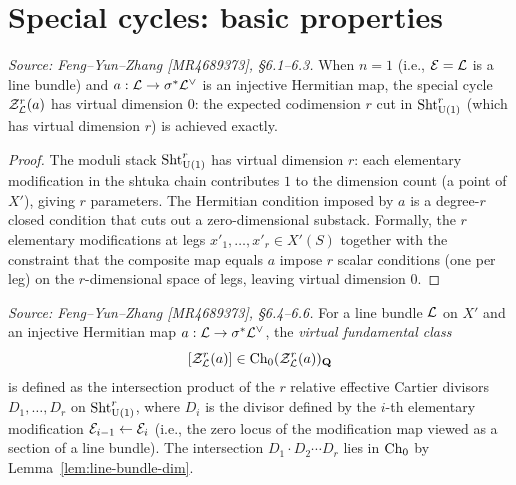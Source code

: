 \section{Special cycles: basic properties}

\begin{lemma}
  \label{lem:line-bundle-dim}
  \textit{Source: Feng--Yun--Zhang [MR4689373], \S6.1--6.3.}
  When \(n = 1\) (i.e., \(\mathcal{E} = \mathcal{L}\) is a line bundle) and
  \(a : \mathcal{L} \to \sigma^*\mathcal{L}^\vee\) is an injective Hermitian map, the special cycle
  \(\mathcal{Z}_{\mathcal{L}}^r(a)\) has virtual dimension \(0\): the expected codimension \(r\) cut
  in \(\operatorname{Sht}_{\operatorname{U}(1)}^r\) (which has virtual dimension \(r\)) is achieved exactly.
\end{lemma}

\begin{proof}
  The moduli stack \(\operatorname{Sht}_{\operatorname{U}(1)}^r\) has virtual dimension \(r\): each elementary
  modification in the shtuka chain contributes \(1\) to the dimension count
  (a point of \(X'\)), giving \(r\) parameters. The Hermitian condition imposed by
  \(a\) is a degree-\(r\) closed condition that cuts out a zero-dimensional substack.
  Formally, the \(r\) elementary modifications at legs \(x'_1, \ldots, x'_r \in X'(S)\)
  together with the constraint that the composite map equals \(a\) impose \(r\) scalar
  conditions (one per leg) on the \(r\)-dimensional space of legs, leaving virtual
  dimension \(0\).
\end{proof}

\begin{definition}
  \label{def:virtual-class-lb}
  \textit{Source: Feng--Yun--Zhang [MR4689373], \S6.4--6.6.}
  For a line bundle \(\mathcal{L}\) on \(X'\) and an injective Hermitian map
  \(a : \mathcal{L} \to \sigma^*\mathcal{L}^\vee\), the \emph{virtual fundamental class}
  \[
    [\mathcal{Z}_{\mathcal{L}}^r(a)] \in \operatorname{Ch}_0(\mathcal{Z}_{\mathcal{L}}^r(a))_{\mathbf{Q}}
  \]
  is defined as the intersection product of the \(r\) relative effective Cartier divisors
  \(D_1, \ldots, D_r\) on \(\operatorname{Sht}_{\operatorname{U}(1)}^r\), where \(D_i\) is the divisor defined by the
  \(i\)-th elementary modification \(\mathcal{E}_{i-1} \leftarrow \mathcal{E}_i\) (i.e., the zero locus
  of the modification map viewed as a section of a line bundle). The intersection
  \(D_1 \cdot D_2 \cdots D_r\) lies in \(\operatorname{Ch}_0\) by Lemma~\ref{lem:line-bundle-dim}.
\end{definition}

